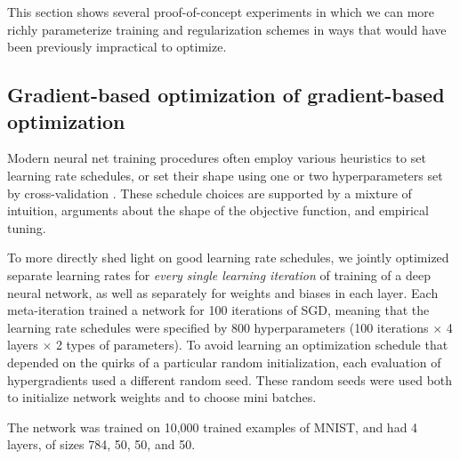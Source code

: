\documentclass{article}
\begin{document}
This section shows several proof-of-concept experiments in which we can more richly parameterize training and regularization schemes in ways that would have been previously impractical to optimize.

\subsection{Gradient-based optimization of gradient-based optimization}
\label{sec:schedule experiments}
Modern neural net training procedures often employ various heuristics to set learning rate schedules, or set their shape using one or two hyperparameters set by cross-validation \cite{dahl2014multi, sutskever2013importance}.
These schedule choices are supported by a mixture of intuition, arguments about the shape of the objective function, and empirical tuning.

To more directly shed light on good learning rate schedules, we jointly optimized separate learning rates for \emph{every single learning iteration} of training of a deep neural network, as well as separately for weights and biases in each layer.
Each meta-iteration trained a network for 100 iterations of SGD, meaning that the learning rate schedules were specified by 800 hyperparameters (100 iterations $\times$ 4 layers $\times$ 2 types of parameters).
To avoid learning an optimization schedule that depended on the quirks of a particular random initialization, each evaluation of hypergradients used a different random seed.
These random seeds were used both to initialize network weights and to choose mini batches.

The network was trained on 10,000 trained examples of MNIST, and had 4 layers, of sizes 784, 50, 50, and 50.
\end{document}
